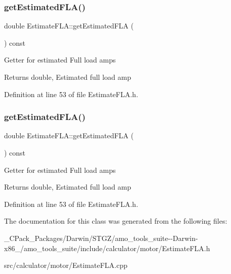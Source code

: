 \subsubsection{\texorpdfstring{get\+Estimated\+F\+L\+A()}{getEstimatedFLA()}\hspace{0.1cm}{\footnotesize\ttfamily [2/3]}}
{\footnotesize\ttfamily double Estimate\+F\+L\+A\+::get\+Estimated\+F\+LA (\begin{DoxyParamCaption}{ }\end{DoxyParamCaption}) const\hspace{0.3cm}{\ttfamily [inline]}}

Getter for estimated Full load amps \begin{DoxyReturn}{Returns}
double, Estimated full load amp 
\end{DoxyReturn}


Definition at line 53 of file Estimate\+F\+L\+A.\+h.

\mbox{\label{class_estimate_f_l_a_adcb6eef313c8184f52b9ca038fbeddaa}} 
\subsubsection{\texorpdfstring{get\+Estimated\+F\+L\+A()}{getEstimatedFLA()}\hspace{0.1cm}{\footnotesize\ttfamily [3/3]}}
{\footnotesize\ttfamily double Estimate\+F\+L\+A\+::get\+Estimated\+F\+LA (\begin{DoxyParamCaption}{ }\end{DoxyParamCaption}) const\hspace{0.3cm}{\ttfamily [inline]}}

Getter for estimated Full load amps \begin{DoxyReturn}{Returns}
double, Estimated full load amp 
\end{DoxyReturn}


Definition at line 53 of file Estimate\+F\+L\+A.\+h.



The documentation for this class was generated from the following files\+:\begin{DoxyCompactItemize}
\item 
\+\_\+\+C\+Pack\+\_\+\+Packages/\+Darwin/\+S\+T\+G\+Z/amo\+\_\+tools\+\_\+suite-\/-\/\+Darwin-\/x86\+\_/amo\+\_\+tools\+\_\+suite/include/calculator/motor/Estimate\+F\+L\+A.\+h\item 
src/calculator/motor/Estimate\+F\+L\+A.\+cpp\end{DoxyCompactItemize}
